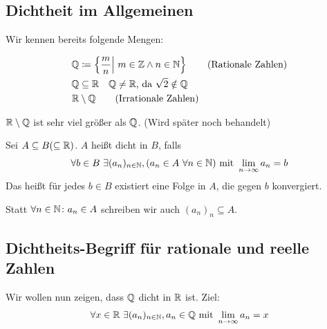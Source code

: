 \subsection{Dichtheit im Allgemeinen}
\thispagestyle{pagenumberonly}

Wir kennen bereits folgende Mengen:

\begin{align*}
    \mathbb{Q}&\coloneqq\left\{\frac{m}{n}\middle|~m\in\mathbb{Z} \land n\in\mathbb{N}\right\}\tag{Rationale Zahlen}\\
    \mathbb{Q}&\subseteq \mathbb{R}\quad \mathbb{Q}\neq\mathbb{R}\text{, da } \sqrt{2}\notin \mathbb{Q}\\
    \mathbb{R}&\setminus\mathbb{Q} \tag{Irrationale Zahlen}
\end{align*}

\begin{bemerkung}
    $\mathbb{R}\setminus\mathbb{Q}$ ist sehr viel größer als $\mathbb{Q}$. (Wird später noch behandelt)
\end{bemerkung}

\begin{definition} %
    Sei $A\subseteq B (\subseteq \mathbb{R})$. $A$ heißt dicht in $B$, falls
    \begin{align*}
        \forall b\in B~\exists (a_n)_{n\in\mathbb{N}}, (a_n \in A~\forall n\in\mathbb{N})\text{ mit }\lim_{n\rightarrow{}\infty} a_n = b
    \end{align*}
    Das heißt für jedes $b\in B$ existiert eine Folge in $A$, die gegen $b$ konvergiert.
\end{definition}

\begin{notation}
    Statt $\forall n\in\mathbb{N}\colon a_n \in A$ schreiben wir auch $(a_n)_n\subseteq A$.
\end{notation}

\subsection{Dichtheits-Begriff für rationale und reelle Zahlen}
Wir wollen nun zeigen, dass $\mathbb{Q}$ dicht in $\mathbb{R}$ ist. Ziel:
\begin{align*}
    \forall x\in\mathbb{R}~\exists (a_n)_{n\in\mathbb{N}}, a_n\in\mathbb{Q}\text{ mit }\lim_{n\rightarrow{}\infty} a_n =x
\end{align*}

